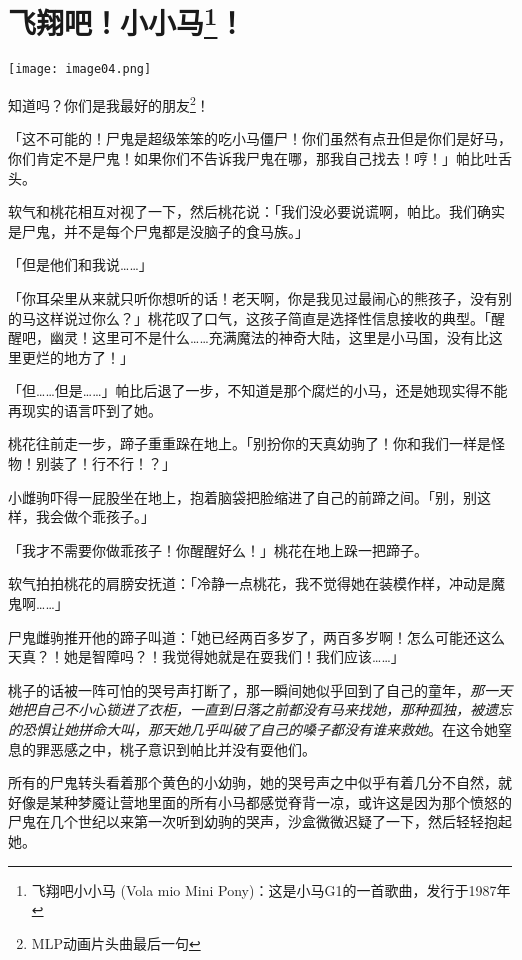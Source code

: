 \chapter[飞翔吧！小小马！]{\texorpdfstring{飞翔吧！小小马\footnote{飞翔吧小小马 (Vola mio Mini Pony)：这是小马G1的一首歌曲，发行于1987年}！}{飞翔吧！小小马！}}

\texttt{[image: image04.png]}


\begin{intro}
知道吗？你们是我最好的朋友\footnote{MLP动画片头曲最后一句}！
\end{intro}


「这不可能的！尸鬼是超级笨笨的吃小马僵尸！你们虽然有点丑但是你们是好马，你们肯定不是尸鬼！如果你们不告诉我尸鬼在哪，那我自己找去！哼！」帕比吐舌头。

软气和桃花相互对视了一下，然后桃花说：「我们没必要说谎啊，帕比。我们确实是尸鬼，并不是每个尸鬼都是没脑子的食马族。」

「但是他们和我说……」

「你耳朵里从来就只听你想听的话！老天啊，你是我见过最闹心的熊孩子，没有别的马这样说过你么？」桃花叹了口气，这孩子简直是选择性信息接收的典型。「醒醒吧，幽灵！这里可不是什么……充满魔法的神奇大陆，这里是小马国，没有比这里更烂的地方了！」

「但……但是……」帕比后退了一步，不知道是那个腐烂的小马，还是她现实得不能再现实的语言吓到了她。

桃花往前走一步，蹄子重重跺在地上。「别扮你的天真幼驹了！你和我们一样是怪物！别装了！行不行！？」

小雌驹吓得一屁股坐在地上，抱着脑袋把脸缩进了自己的前蹄之间。「别，别这样，我会做个乖孩子。」

「我才不需要你做乖孩子！你醒醒好么！」桃花在地上跺一把蹄子。

软气拍拍桃花的肩膀安抚道：「冷静一点桃花，我不觉得她在装模作样，冲动是魔鬼啊……」

尸鬼雌驹推开他的蹄子叫道：「她已经两百多岁了，两百多岁啊！怎么可能还这么天真？！她是智障吗？！我觉得她就是在耍我们！我们应该……」

桃子的话被一阵可怕的哭号声打断了，那一瞬间她似乎回到了自己的童年，\emph{那一天她把自己不小心锁进了衣柜，一直到日落之前都没有马来找她，那种孤独，被遗忘的恐惧让她拼命大叫，那天她几乎叫破了自己的嗓子都没有谁来救她}。在这令她窒息的罪恶感之中，桃子意识到帕比并没有耍他们。

所有的尸鬼转头看着那个黄色的小幼驹，她的哭号声之中似乎有着几分不自然，就好像是某种梦魇让营地里面的所有小马都感觉脊背一凉，或许这是因为那个愤怒的尸鬼在几个世纪以来第一次听到幼驹的哭声，沙盒微微迟疑了一下，然后轻轻抱起她。

